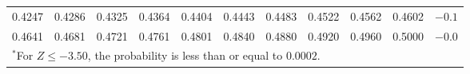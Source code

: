 \begin{table}[p]
\begin{center}
{\begin{tabular}{| rrrrr | rrrrr | c}
  \footnotesize{0.4247} & \footnotesize{0.4286} & \footnotesize{0.4325} & \footnotesize{0.4364} & \footnotesize{0.4404} & \footnotesize{0.4443} & \footnotesize{0.4483} & \footnotesize{0.4522} & \footnotesize{0.4562} & \footnotesize{0.4602} & $-0.1$ \\
  \footnotesize{0.4641} & \footnotesize{0.4681} & \footnotesize{0.4721} & \footnotesize{0.4761} & \footnotesize{0.4801} & \footnotesize{0.4840} & \footnotesize{0.4880} & \footnotesize{0.4920} & \footnotesize{0.4960} & \footnotesize{0.5000} & $-0.0$ \\
    \hline
\multicolumn{11}{l}{{\normalsize$^*$For $Z \leq -3.50$, the probability is less than or equal to $0.0002$.}}
\end{tabular}}
\label{normTableSide1}
\end{center}
\end{table}

